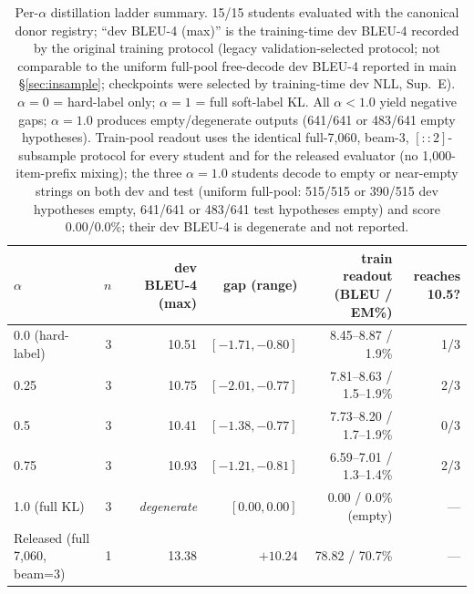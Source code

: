 \documentclass[pdflatex,sn-chicago]{sn-jnl}
\begin{document}
\begin{table}[h]
\centering
\scriptsize\setlength{\tabcolsep}{3pt}
\caption{Per-$\alpha$ distillation ladder summary. 15/15 students evaluated with the canonical donor registry; ``dev BLEU-4 (max)'' is the training-time dev BLEU-4 recorded by the original training protocol (legacy validation-selected protocol; not comparable to the uniform full-pool free-decode dev BLEU-4 reported in main \S\ref{sec:insample}; checkpoints were selected by training-time dev NLL, Sup.~E). $\alpha{=}0$ = hard-label only; $\alpha{=}1$ = full soft-label KL. All $\alpha{<}1.0$ yield negative gaps; $\alpha{=}1.0$ produces empty/degenerate outputs (641/641 or 483/641 empty hypotheses). Train-pool readout uses the identical full-7{,}060, beam-3, $[::2]$-subsample protocol for every student and for the released evaluator (no 1{,}000-item-prefix mixing); the three $\alpha{=}1.0$ students decode to empty or near-empty strings on both dev and test (uniform full-pool: 515/515 or 390/515 dev hypotheses empty, 641/641 or 483/641 test hypotheses empty) and score 0.00/0.0\%; their dev BLEU-4 is degenerate and not reported.}
\label{tab:s5_distill_alpha}
\begin{tabular}{lrrrrr}
\toprule
$\alpha$ & $n$ & dev BLEU-4 (max) & gap (range) & train readout (BLEU / EM\%) & reaches 10.5? \\
\midrule
0.0 (hard-label) & 3 & 10.51 & $[-1.71, -0.80]$ & 8.45--8.87 / 1.9\% & 1/3 \\
0.25 & 3 & 10.75 & $[-2.01, -0.77]$ & 7.81--8.63 / 1.5--1.9\% & 2/3 \\
0.5 & 3 & 10.41 & $[-1.38, -0.77]$ & 7.73--8.20 / 1.7--1.9\% & 0/3 \\
0.75 & 3 & 10.93 & $[-1.21, -0.81]$ & 6.59--7.01 / 1.3--1.4\% & 2/3 \\
1.0 (full KL) & 3 & \emph{degenerate} & $[0.00, 0.00]$ & 0.00 / 0.0\% (empty) & --- \\
\midrule
Released (full 7{,}060, beam=3) & 1 & 13.38 & $+10.24$ & 78.82 / 70.7\% & --- \\
\bottomrule
\end{tabular}
\end{table}
\end{document}

